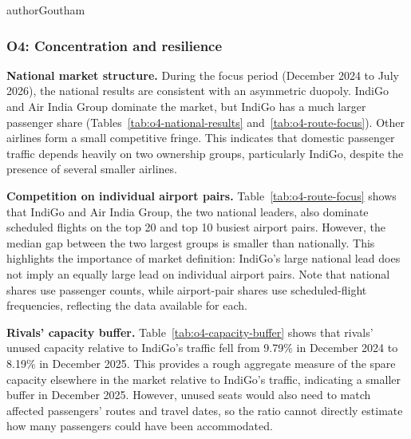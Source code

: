 \begin{mergedcontribution}{authorGoutham}
\subsubsection{O4: Concentration and resilience}
\textbf{National market structure.} During the focus period (December 2024 to July 2026), the national results are consistent with an asymmetric duopoly. IndiGo and Air India Group dominate the market, but IndiGo has a much larger passenger share (Tables~\ref{tab:o4-national-results} and~\ref{tab:o4-route-focus}). Other airlines form a small competitive fringe. This indicates that domestic passenger traffic depends heavily on two ownership groups, particularly IndiGo, despite the presence of several smaller airlines.

\textbf{Competition on individual airport pairs.} Table~\ref{tab:o4-route-focus} shows that IndiGo and Air India Group, the two national leaders, also dominate scheduled flights on the top 20 and top 10 busiest airport pairs. However, the median gap between the two largest groups is smaller than nationally. This highlights the importance of market definition: IndiGo's large national lead does not imply an equally large lead on individual airport pairs. Note that national shares use passenger counts, while airport-pair shares use scheduled-flight frequencies, reflecting the data available for each.

\textbf{Rivals' capacity buffer.} Table~\ref{tab:o4-capacity-buffer} shows that rivals' unused capacity relative to IndiGo's traffic fell from 9.79\% in December 2024 to 8.19\% in December 2025. This provides a rough aggregate measure of the spare capacity elsewhere in the market relative to IndiGo's traffic, indicating a smaller buffer in December 2025. However, unused seats would also need to match affected passengers' routes and travel dates, so the ratio cannot directly estimate how many passengers could have been accommodated.
\end{mergedcontribution}

\FloatBarrier
\clearpage
